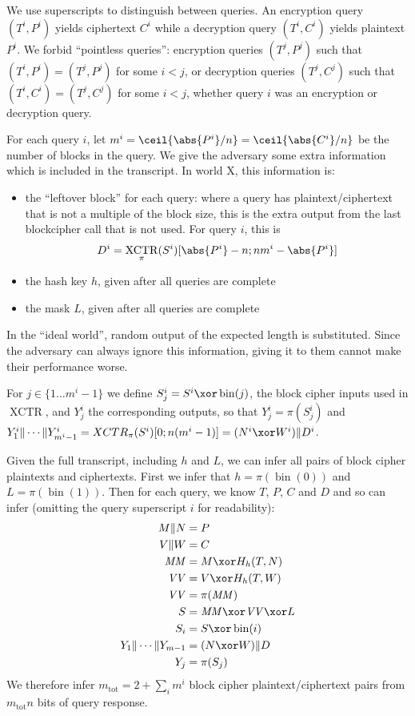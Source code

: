 \documentclass[letterpaper,11pt]{article}
\newcommand*{\Concat}{\Vert}
\newcommand*{\MM}{\mathit{MM}}
\newcommand*{\mtot}{m_{\mathrm{tot}}}
\newcommand*{\VV}{\mathit{VV}}
\DeclareMathOperator{\fromint}{bin}
\DeclareMathOperator{\XCTR}{XCTR}
\begin{document}
We use superscripts to distinguish between queries.
An encryption query \((T^i, P^i)\) yields ciphertext \(C^i\)
while a decryption query \((T^i, C^i)\)
yields plaintext \(P^i\).
We forbid ``pointless queries'':
encryption queries \((T^j, P^j)\)
such that \((T^i, P^i) = (T^j, P^j)\) for some \(i < j\), 
or decryption queries \((T^j, C^j)\)
such that \((T^i, C^i) = (T^j, C^j)\) for some \(i < j\),
whether query \(i\) was an encryption or decryption query.

For each query \(i\), let \(m^i = \ceil{\abs{P^i}/n} = \ceil{\abs{C^i}/n}\)
be the number of blocks in the query.
We give the adversary some 
extra information
which is included in the transcript.
In world X, this information is:
\begin{itemize}
    \item the ``leftover block'' for each query:
    where a query has plaintext/ciphertext
    that is not a multiple of the block size,
    this is the extra output from the last
    blockcipher call that is not used.
    For query \(i\), this is 
    \begin{displaymath}
        D^i = \XCTR_\pi(S^i)[\abs{P^i} - n; nm^i-\abs{P^i}]
    \end{displaymath}
    \item the hash key \(h\), given after all queries are complete
    \item the mask \(L\), given after all queries are complete
\end{itemize}
In the ``ideal world'', random output of the expected
length is substituted. Since the adversary can always ignore
this information, giving it to them cannot make their performance worse.

For \(j \in \{1 \ldots m^i-1\}\) we define \(S_j^i = S^i \xor \fromint(j)\),
the block cipher inputs used in \(\XCTR\), and \(Y_j^i\) the corresponding
outputs, so that \(Y_j^i = \pi(S_j^i)\) and 
\(Y_1^i \Concat \cdots \Concat Y_{m^i-1}^i = XCTR_\pi(S^i)[0;n(m^i -1)] 
= (N^i \xor W^i) \Concat D^i\).

Given the full transcript, including \(h\) and \(L\),
we can infer all pairs of block cipher plaintexts and ciphertexts.
First we infer that \(h = \pi(\fromint(0))\) and \(L = \pi(\fromint(1))\).
Then for each query, we know \(T\), \(P\), \(C\) and \(D\)
and so can infer
(omitting the query superscript \(i\) for readability):
\begin{align*}
    M \Concat N &= P \\
    V \Concat W &= C \\
    \MM &= M \xor H_h(T, N)\\
    \VV &= V \xor H_h(T, W)\\
    \VV &= \pi(\MM)\\
    S &= \MM \xor \VV \xor L\\ 
    S_i &= S \xor \fromint(i)\\
    Y_1 \Concat \cdots \Concat Y_{m-1} &= (N \xor W) \Concat D \\
    Y_j &= \pi(S_j) \\
\end{align*}
We therefore infer \(\mtot = 2 + \sum_i m^i \) block cipher
plaintext/ciphertext pairs from \(\mtot n\) bits of query response.
\end{document}
